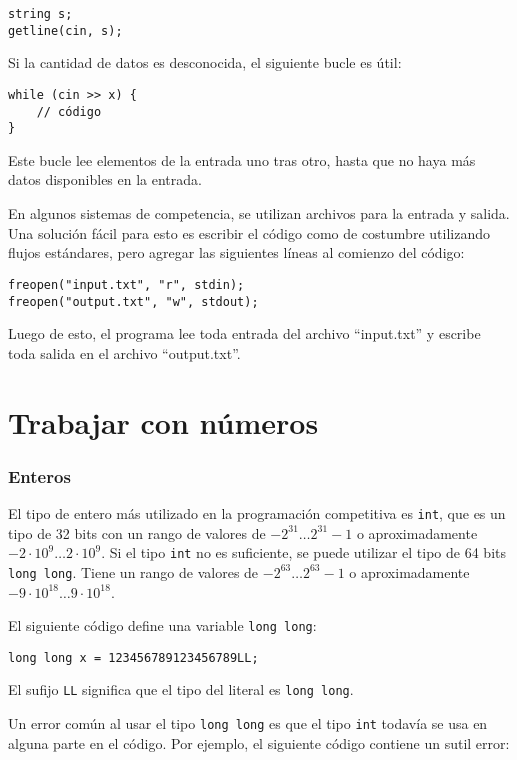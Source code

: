 \begin{lstlisting}
string s;
getline(cin, s);
\end{lstlisting}

\newpage %
Si la cantidad de datos es desconocida, el siguiente
bucle es útil:
\begin{lstlisting}
while (cin >> x) {
    // código
}
\end{lstlisting}
Este bucle lee elementos de la entrada
uno tras otro, hasta que no haya
más datos disponibles en la entrada.

En algunos sistemas de competencia, se utilizan archivos para
la entrada y salida.
Una solución fácil para esto es escribir
el código como de costumbre utilizando flujos estándares,
pero agregar las siguientes líneas al comienzo del código:
\begin{lstlisting}
freopen("input.txt", "r", stdin);
freopen("output.txt", "w", stdout);
\end{lstlisting}
Luego de esto, el programa lee toda entrada del archivo
``input.txt'' y escribe toda salida en el archivo
``output.txt''.

\section{Trabajar con números}

\subsubsection{Enteros}


El tipo de entero más utilizado en la programación competitiva
es \texttt{int}, que es un tipo de 32 bits con
un rango de valores de $-2^{31} \ldots 2^{31}-1$
o aproximadamente $-2 \cdot 10^9 \ldots 2 \cdot 10^9$.
Si el tipo \texttt{int} no es suficiente,
se puede utilizar el tipo de 64 bits \texttt{long long}.
Tiene un rango de valores de $-2^{63} \ldots 2^{63}-1$
o aproximadamente $-9 \cdot 10^{18} \ldots 9 \cdot 10^{18}$.

El siguiente código define una
variable \texttt{long long}:
\begin{lstlisting}
long long x = 123456789123456789LL;
\end{lstlisting}
El sufijo \texttt{LL} significa que el
tipo del literal es \texttt{long long}.

Un error común al usar el tipo \texttt{long long}
es que el tipo \texttt{int} todavía se usa en alguna parte
en el código.
Por ejemplo, el siguiente código contiene
un sutil error:

